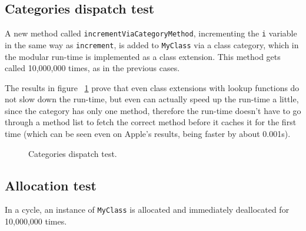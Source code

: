 \subsection{Categories dispatch test}

A new method called \verb=incrementViaCategoryMethod=, incrementing the \verb=i= variable in the same way as \verb=increment=, is added to \verb=MyClass= via a class category, which in the modular run-time is implemented as a class extension. This method gets called 10,000,000 times, as in the previous cases.

The results in figure ~\ref{fig:categories_dispatch_test} prove that even class extensions with lookup functions do not slow down the run-time, but even can actually speed up the run-time a little, since the category has only one method, therefore the run-time doesn't have to go through a method list to fetch the correct method before it caches it for the first time (which can be seen even on Apple's results, being faster by about 0.001s).

\begin{figure}[H]
  \centering{}
  \caption{Categories dispatch test.}
  \label{fig:categories_dispatch_test}
\end{figure}


\subsection{Allocation test}

In a cycle, an instance of \verb=MyClass= is allocated and immediately deallocated for 10,000,000 times.


